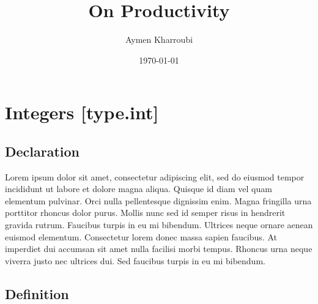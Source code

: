 \documentclass[a4paper, oneside, 10pt]{article}
\begin{document}
	\title            {On Productivity}
	\author           {Aymen Kharroubi}
	\date             {\today}
	\maketitle
	\tableofcontents
	\clearpage




	\section[Integers]{Integers \hfill [type.int]} %

		\subsection{Declaration} %




			Lorem ipsum dolor sit amet, consectetur adipiscing elit, sed do eiusmod tempor incididunt ut labore et dolore magna aliqua. Quisque id diam vel quam elementum pulvinar. Orci nulla pellentesque dignissim enim. Magna fringilla urna porttitor rhoncus dolor purus. Mollis nunc sed id semper risus in hendrerit gravida rutrum. Faucibus turpis in eu mi bibendum. Ultrices neque ornare aenean euismod elementum. Consectetur lorem donec massa sapien faucibus. At imperdiet dui accumsan sit amet nulla facilisi morbi tempus. Rhoncus urna neque viverra justo nec ultrices dui. Sed faucibus turpis in eu mi bibendum.

		\subsection{Definition} %
\end{document}
